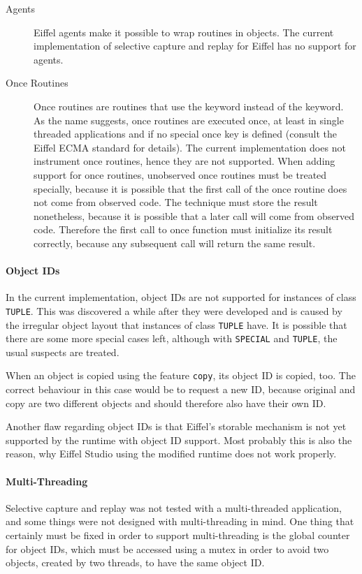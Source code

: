 \begin{description}
 \item [Agents] Eiffel agents make it possible to wrap routines in objects. The current implementation of selective capture and replay for Eiffel has no support for agents.

 \item [Once Routines] Once routines are routines that use the  keyword instead of the  keyword. As the name suggests, once routines are executed once, at least in single threaded applications and if no special once key is defined (consult the Eiffel ECMA standard \cite{Eiffel-ECMA} for details). The current implementation does not instrument once routines, hence they are not supported. When adding support for once routines, unobserved once routines must be treated specially, because it is possible that the first call of the once routine does not come from observed code. The technique must store the result nonetheless, because it is possible that a later call will come from observed code. Therefore the first call to once function must initialize its result correctly, because any subsequent call will return the same result.
\end{description}

\paragraph{Object IDs}
In the current implementation, object IDs are not supported for instances of class \texttt{TUPLE}. This was discovered a while after they were developed and is caused by the irregular object layout that instances of class \texttt{TUPLE} have. It is possible that there are some more special cases left, although with \texttt{SPECIAL} and \texttt{TUPLE}, the usual suspects are treated.

When an object is copied using the feature \texttt{copy}, its object ID is copied, too. The correct behaviour in this case would be to request a new ID, because original and copy are two different objects and should therefore also have their own ID.

Another flaw regarding object IDs is that Eiffel's storable mechanism is not yet supported by the runtime with object ID support. Most probably this is also the reason, why Eiffel Studio using the modified runtime does not work properly.

\paragraph{Multi-Threading}
Selective capture and replay was not tested with a multi-threaded application, and some things were not designed with multi-threading in mind. One thing that certainly must be fixed in order to support multi-threading is the global counter for object IDs, which must be accessed using a mutex in order to avoid two objects, created by two threads, to have the same object ID.

